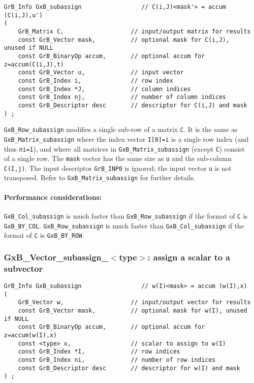 \documentclass[12pt]{article}
\begin{document}
\begin{mdframed}[userdefinedwidth=6in]
{\footnotesize
\begin{verbatim}
GrB_Info GxB_subassign                 // C(i,J)<mask'> = accum (C(i,J),u')
(
    GrB_Matrix C,                   // input/output matrix for results
    const GrB_Vector mask,          // optional mask for C(i,J), unused if NULL
    const GrB_BinaryOp accum,       // optional accum for z=accum(C(i,J),t)
    const GrB_Vector u,             // input vector
    const GrB_Index i,              // row index
    const GrB_Index *J,             // column indices
    const GrB_Index nj,             // number of column indices
    const GrB_Descriptor desc       // descriptor for C(i,J) and mask
) ;
\end{verbatim} } \end{mdframed}

\verb'GxB_Row_subassign' modifies a single sub-row of a matrix \verb'C'.  It is
the same as \verb'GxB_Matrix_subassign' where the index vector \verb'I[0]=i' is
a single row index (and thus \verb'ni=1'), and where all matrices in
\verb'GxB_Matrix_subassign' (except \verb'C') consist of a single row.  The
\verb'mask' vector has the same size as \verb'u' and the sub-column
\verb'C(I,j)'.  The input descriptor \verb'GrB_INP0' is ignored; the input
vector \verb'u' is not transposed.  Refer to \verb'GxB_Matrix_subassign' for
further details.

\paragraph{\bf Performance considerations:} %
\verb'GxB_Col_subassign' is much faster than \verb'GxB_Row_subassign' if the
format of \verb'C' is \verb'GxB_BY_COL'.  \verb'GxB_Row_subassign' is much
faster than \verb'GxB_Col_subassign' if the format of \verb'C' is
\verb'GxB_BY_ROW'.

\subsubsection{{\sf GxB\_Vector\_subassign\_$<$type$>$:} assign a scalar to a subvector}
\label{subassign_vector_scalar}

\begin{mdframed}[userdefinedwidth=6in]
{\footnotesize
\begin{verbatim}
GrB_Info GxB_subassign                 // w(I)<mask> = accum (w(I),x)
(
    GrB_Vector w,                   // input/output vector for results
    const GrB_Vector mask,          // optional mask for w(I), unused if NULL
    const GrB_BinaryOp accum,       // optional accum for z=accum(w(I),x)
    const <type> x,                 // scalar to assign to w(I)
    const GrB_Index *I,             // row indices
    const GrB_Index ni,             // number of row indices
    const GrB_Descriptor desc       // descriptor for w(I) and mask
) ;
\end{verbatim} } \end{mdframed}
\end{document}
